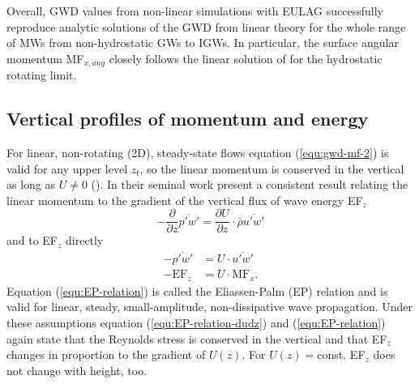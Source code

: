 Overall, GWD values from non-linear simulations with EULAG successfully reproduce analytic solutions of the GWD from linear theory for the whole range of MWs from non-hydrostatic GWs to IGWs. In particular, the surface angular momentum MF$_{x,ang}$ closely follows the linear solution of \textcite[]{miranda_non-linear_1992} for the hydrostatic rotating limit.




\subsection*{Vertical profiles of momentum and energy}
For linear, non-rotating (2D), steady-state flows equation (\ref{equ:gwd-mf-2}) is valid for any upper level $z_t$, so the linear momentum is conserved in the vertical as long as $U \neq 0$ (\cite[]{durran_lee_2003}). In their seminal work \textcite[]{eliassen_transfer_1960} present a consistent result relating the linear momentum to the gradient of the vertical flux of wave energy EF$_z$
\begin{equation}
    -\frac{\partial}{\partial z}\overbar{p'w'} = \frac{\partial U}{\partial z} \cdot \bar{\rho} \overbar{u'w'}
    \label{equ:EP-relation-dudz}
\end{equation}
and to EF$_z$ directly
\begin{equation}
    \begin{aligned}
    -\overbar{p'w'}& = U \cdot \overbar{u'w'} \\
    -\mathrm{EF}_z& = U \cdot \mathrm{MF}_x.
    \end{aligned}
    \label{equ:EP-relation}
\end{equation}
Equation (\ref{equ:EP-relation}) is called the Eliassen-Palm (EP) relation and is valid for linear, steady, small-amplitude, non-dissipative wave propagation. Under these assumptions equation (\ref{equ:EP-relation-dudz}) and (\ref{equ:EP-relation}) again state that the Reynolds stress is conserved in the vertical and that EF$_z$ changes in proportion to the gradient of $U(z)$. For $U(z)=$const. EF$_z$ does not change with height, too.

